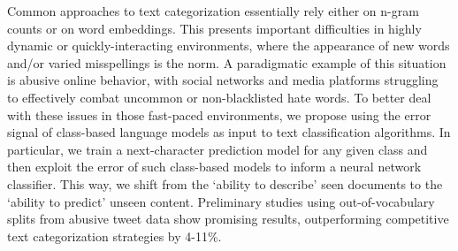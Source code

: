 Common approaches  to text categorization essentially rely either on n-gram counts or on word embeddings. This presents important difficulties in highly dynamic or quickly-interacting environments, where the appearance of new words and/or varied misspellings is the norm. A paradigmatic example of this situation is abusive online behavior, with social networks and media platforms struggling to effectively combat uncommon or non-blacklisted hate words. To better deal with these issues in those fast-paced environments, we propose using the error signal of class-based language models as input to text classification algorithms. In particular, we train a next-character prediction model for any given class and then exploit the error of such class-based models to inform a neural network classifier. This way, we shift from the ‘ability to describe' seen documents to the ‘ability to predict' unseen content. Preliminary studies using out-of-vocabulary splits from abusive tweet data show promising results, outperforming competitive text categorization strategies by 4-11\%.
